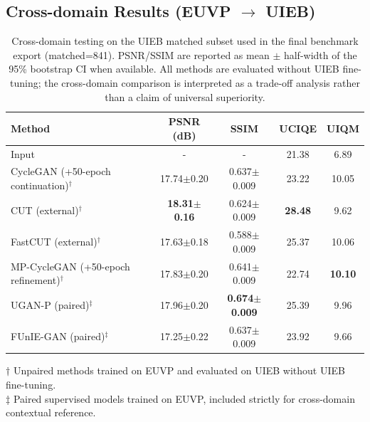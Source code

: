 \documentclass[final,1p,times]{elsarticle}
\begin{document}
\subsection[Cross-domain Results (EUVP to UIEB)]{Cross-domain Results (EUVP $\rightarrow$ UIEB)}
\begin{table}[!t]
\centering
\caption{Cross-domain testing on the UIEB matched subset used in the final benchmark export (matched=841). PSNR/SSIM are reported as mean $\pm$ half-width of the 95\% bootstrap CI when available. All methods are evaluated without UIEB fine-tuning; the cross-domain comparison is interpreted as a trade-off analysis rather than a claim of universal superiority.}
\label{tab:uieb_quant}
\begin{tabular}{lcccc}
\toprule
Method & PSNR (dB) & SSIM & UCIQE & UIQM \\
\midrule
Input & - & - & 21.38 & 6.89 \\
\midrule
CycleGAN (+50-epoch continuation)$^\dagger$ & 17.74$\pm$0.20 & 0.637$\pm$0.009 & 23.22 & 10.05 \\
CUT (external)$^\dagger$ & \textbf{18.31$\pm$0.16} & 0.624$\pm$0.009 & \textbf{28.48} & 9.62 \\
FastCUT (external)$^\dagger$ & 17.63$\pm$0.18 & 0.588$\pm$0.009 & 25.37 & 10.06 \\
MP-CycleGAN (+50-epoch refinement)$^\dagger$ & 17.83$\pm$0.20 & 0.641$\pm$0.009 & 22.74 & \textbf{10.10} \\
\midrule
UGAN-P (paired)$^\ddagger$ & 17.96$\pm$0.20 & \textbf{0.674$\pm$0.009} & 25.39 & 9.96 \\
FUnIE-GAN (paired)$^\ddagger$ & 17.25$\pm$0.22 & 0.637$\pm$0.009 & 23.92 & 9.66 \\
\bottomrule
\end{tabular}
\vspace{2pt}

\footnotesize
$\dagger$ Unpaired methods trained on EUVP and evaluated on UIEB without UIEB fine-tuning.\\
$\ddagger$ Paired supervised models trained on EUVP, included strictly for cross-domain contextual reference.
\end{table}
\end{document}
